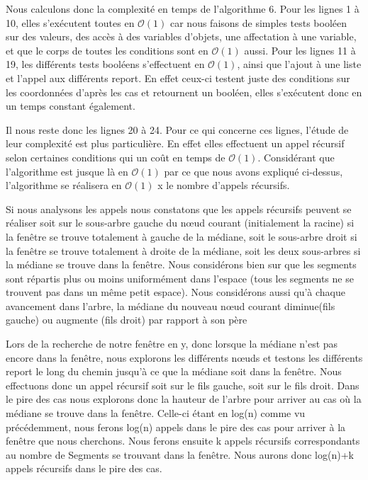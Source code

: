 \documentclass[10pt,a4paper]{article}
\begin{document}
Nous calculons donc la complexité en temps de l'algorithme 6.
Pour les lignes 1 à 10, elles s’exécutent toutes en $\mathcal{O}(1)$ car nous faisons de simples tests booléen sur des valeurs, des accès à des variables d'objets, une affectation à une variable, et que le corps de toutes les conditions sont en $\mathcal{O}(1)$ aussi.
Pour les lignes 11 à 19, les différents tests booléens s'effectuent en $\mathcal{O}(1)$, ainsi que l'ajout à une liste et l'appel aux différents report. En effet ceux-ci testent juste des conditions sur les coordonnées d'après les cas et retournent un booléen, elles s’exécutent donc en un temps constant également.

Il nous reste donc les lignes 20 à 24. Pour ce qui concerne ces lignes, l'étude de leur complexité est plus particulière. En effet elles effectuent un appel récursif selon certaines conditions qui un coût en temps de $\mathcal{O}(1)$.
Considérant que l'algorithme est jusque là en $\mathcal{O}(1)$ par ce que nous avons expliqué ci-dessus, l'algorithme se réalisera en $\mathcal{O}(1)$ x le nombre d'appels récursifs.

Si nous analysons les appels nous constatons que les appels récursifs peuvent se réaliser soit sur le sous-arbre gauche du nœud courant (initialement la racine) si la fenêtre se trouve totalement à gauche de la médiane, soit le sous-arbre droit si la fenêtre se trouve totalement à droite de la médiane, soit les deux sous-arbres si la médiane se trouve dans la fenêtre. Nous considérons bien sur que les segments sont répartis plus ou moins uniformément dans l'espace (tous les segments ne se trouvent pas dans un même petit espace). Nous considérons aussi qu'à chaque avancement dans l'arbre, la médiane du nouveau nœud courant diminue(fils gauche) ou augmente (fils droit) par rapport à son père

Lors de la recherche de notre fenêtre en y, donc lorsque la médiane n'est pas encore dans la fenêtre, nous explorons les différents nœuds et testons les différents report le long du chemin jusqu'à ce que la médiane soit dans la fenêtre. Nous effectuons donc un appel récursif soit sur le fils gauche, soit sur le fils droit. Dans le pire des cas nous explorons donc la hauteur de l'arbre pour arriver au cas où la médiane se trouve dans la fenêtre. Celle-ci étant en log(n) comme vu précédemment, nous ferons log(n) appels dans le pire des cas pour arriver à la fenêtre que nous cherchons. Nous ferons ensuite k appels récursifs correspondants au nombre de Segments se trouvant dans la fenêtre. Nous aurons donc log(n)+k appels récursifs dans le pire des cas.
\end{document}
